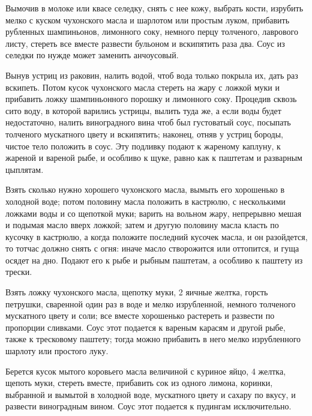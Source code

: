 
Вымочив в молоке или квасе селедку, снять с нее кожу, выбрать кости, изрубить мелко с куском чухонского масла и шарлотом или простым луком, прибавить рубленных шампиньонов, лимонного соку, немного перцу толченого, лаврового листу, стереть все вместе развести бульоном и вскипятить раза два. Соус из селедки по нужде может заменить анчоусовый. 


Вынув устриц из раковин, налить водой, чтоб вода только покрыла их, дать раз вскипеть. Потом кусок чухонского масла стереть на жару с ложкой муки и прибавить ложку шампиньонного порошку и лимонного соку. Процедив сквозь сито воду, в которой варились устрицы, вылить туда же, а если воды будет недостаточно, налить виноградного вина чтоб был густоватый соус, посыпать толченого мускатного цвету и вскипятить; наконец, отняв у устриц бороды, чистое тело положить в соус. Эту подливку подают к жареному каплуну, к жареной и вареной рыбе, и особливо к щуке, равно как к паштетам и разварным цыплятам. 


Взять сколько нужно хорошего чухонского масла, вымыть его хорошенько в холодной воде; потом половину масла положить в кастрюлю, с несколькими ложками воды и со щепоткой муки; варить на вольном жару, непрерывно мешая и подымая масло вверх ложкой; затем и другую половину масла класть по кусочку в кастрюлю, а когда положите последний кусочек масла, и он разойдется, то тотчас должно снять с огня: иначе масло створожится или оттопится, и гуща осядет на дно. Подают его к рыбе и рыбным паштетам, а особливо к паштету из трески. 


Взять ложку чухонского масла, щепотку муки, 2 яичные желтка, горсть петрушки, сваренной один раз в воде и мелко изрубленной, немного толченого мускатного цвету и соли; все вместе хорошенько растереть и развести по пропорции сливками. Соус этот подается к вареным карасям и другой рыбе, также к тресковому паштету; тогда можно прибавить в него мелко изрубленного шарлоту или простого луку. 


Берется кусок мытого коровьего масла величиной с куриное яйцо, 4 желтка, щепоть муки, стереть вместе, прибавить сок из одного лимона, коринки, выбранной и вымытой в холодной воде, мускатного цвету и сахару по вкусу, и развести виноградным вином. Соус этот подается к пудингам исключительно. 

